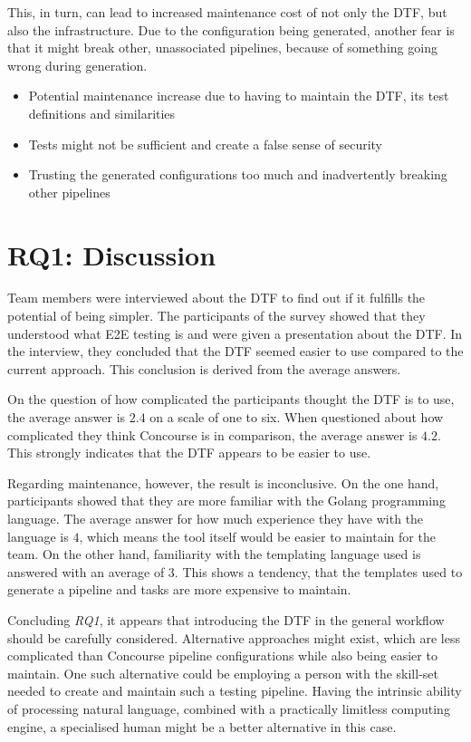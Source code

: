 This, in turn, can lead to increased maintenance cost of not only the DTF, but also the infrastructure.
Due to the configuration being generated, another fear is that it might break other, unassociated pipelines, because of something going wrong during generation.

\begin{itemize}
    \item Potential maintenance increase due to having to maintain the DTF, its test definitions and similarities
    \item Tests might not be sufficient and create a false sense of security
    \item Trusting the generated configurations too much and inadvertently breaking other pipelines
\end{itemize}

\section{RQ1: Discussion}\label{sec:q1:-discussion}

Team members were interviewed about the DTF to find out if it fulfills the potential of being simpler.
The participants of the survey showed that they understood what E2E testing is and were given a presentation about the DTF.
In the interview, they concluded that the DTF seemed easier to use compared to the current approach.
This conclusion is derived from the average answers.

On the question of how complicated the participants thought the DTF is to use, the average answer is $2.4$ on a scale of one to six.
When questioned about how complicated they think Concourse is in comparison, the average answer is $4.2$.
This strongly indicates that the DTF appears to be easier to use.

Regarding maintenance, however, the result is inconclusive.
On the one hand, participants showed that they are more familiar with the Golang programming language.
The average answer for how much experience they have with the language is $4$, which means the tool itself would be easier to maintain for the team.
On the other hand, familiarity with the templating language used is answered with an average of $3$.
This shows a tendency, that the templates used to generate a pipeline and tasks are more expensive to maintain.

\pagebreak

Concluding \textit{RQ1}, it appears that introducing the DTF in the general workflow should be carefully considered.
Alternative approaches might exist, which are less complicated than Concourse pipeline configurations while also being easier to maintain.
One such alternative could be employing a person with the skill-set needed to create and maintain such a testing pipeline.
Having the intrinsic ability of processing natural language, combined with a practically limitless computing engine, a specialised human might be a better alternative in this case.
